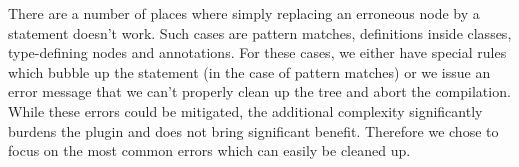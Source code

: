 There are a number of places where simply replacing an erroneous node by a statement doesn't work. Such cases are pattern matches, definitions inside classes, type-defining nodes and annotations. For these cases, we either have special rules which bubble up the statement (in the case of pattern matches) or we issue an error message that we can't properly clean up the tree and abort the compilation. While these errors could be mitigated, the additional complexity significantly burdens the plugin and does not bring significant benefit. Therefore we chose to focus on the most common errors which can easily be cleaned up.


